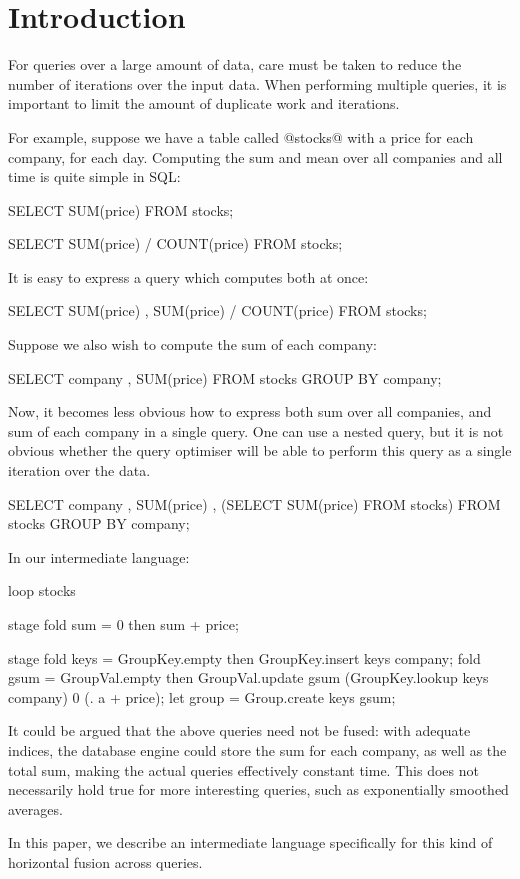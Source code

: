 \section{Introduction}
\label{s:Introduction}


For queries over a large amount of data, care must be taken to reduce the number of iterations over the input data.
When performing multiple queries, it is important to limit the amount of duplicate work and iterations.

For example, suppose we have a table called @stocks@ with a price for each company, for each day.
Computing the sum and mean over all companies and all time is quite simple in SQL:
\begin{code}
SELECT SUM(price)
FROM stocks;

SELECT SUM(price) / COUNT(price)
FROM stocks;
\end{code}

It is easy to express a query which computes both at once:
\begin{code}
SELECT SUM(price)
     , SUM(price) / COUNT(price)
FROM stocks;
\end{code}

Suppose we also wish to compute the sum of each company:
\begin{code}
SELECT company
     , SUM(price)
FROM stocks
GROUP BY company;
\end{code}

Now, it becomes less obvious how to express both sum over all companies, and sum of each company in a single query.
One can use a nested query, but it is not obvious whether the query optimiser will be able to perform this query as a single iteration over the data. 
\begin{code}
SELECT company
     , SUM(price)
     , (SELECT SUM(price) FROM stocks)
FROM stocks
GROUP BY company;
\end{code}

In our intermediate language:
\begin{code}
loop stocks {
  stage {
    fold sum   = 0
         then    sum + price;
  }

  stage {
    fold keys  = GroupKey.empty
         then    GroupKey.insert keys company;
    fold gsum  = GroupVal.empty
         then    GroupVal.update
                  gsum
                  (GroupKey.lookup keys company)
                  0
                  (\a. a + price);
    let  group = Group.create keys gsum;
  }
}
\end{code}


It could be argued that the above queries need not be fused: with adequate indices, the database engine could store the sum for each company, as well as the total sum, making the actual queries effectively constant time.
This does not necessarily hold true for more interesting queries, such as exponentially smoothed averages.

In this paper, we describe an intermediate language specifically for this kind of horizontal fusion across queries.



